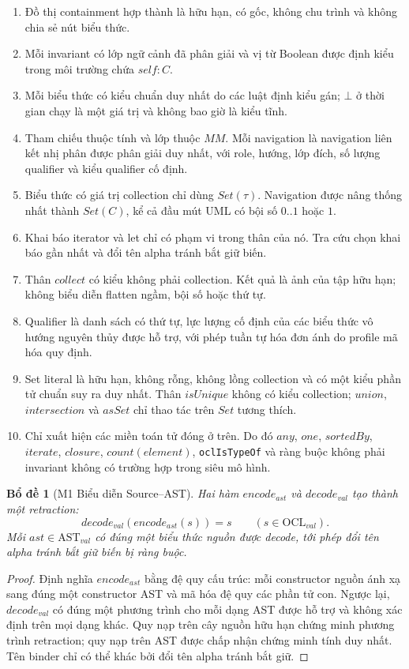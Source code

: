 \documentclass[11pt,a4paper]{article}
\newtheorem{lemma}{Bổ đề}
\theoremstyle{definition}
\newcommand{\OCLval}{\mathrm{OCL}_{val}}
\newcommand{\ASTval}{\mathrm{AST}_{val}}
\begin{document}
\begin{enumerate}[label=(MV-WF\arabic*)]
  \item Đồ thị containment hợp thành là hữu hạn, có gốc, không chu trình và
  không chia sẻ nút biểu thức.
  \item Mỗi invariant có lớp ngữ cảnh đã phân giải và vị từ Boolean được định
  kiểu trong môi trường chứa $self:C$.
  \item Mỗi biểu thức có kiểu chuẩn duy nhất do các luật định kiểu gán; $\bot$
  ở thời gian chạy là một giá trị và không bao giờ là kiểu tĩnh.
  \item Tham chiếu thuộc tính và lớp thuộc $MM$. Mỗi navigation là navigation
  liên kết nhị phân được phân giải duy nhất, với role, hướng, lớp đích, số lượng
  qualifier và kiểu qualifier cố định.
  \item Biểu thức có giá trị collection chỉ dùng $Set(\tau)$. Navigation được
  nâng thống nhất thành $Set(C)$, kể cả đầu mút UML có bội số $0..1$ hoặc $1$.
  \item Khai báo iterator và let chỉ có phạm vi trong thân của nó. Tra cứu chọn
  khai báo gần nhất và đổi tên alpha tránh bắt giữ biến.
  \item Thân $collect$ có kiểu không phải collection. Kết quả là ảnh của tập
  hữu hạn; không biểu diễn flatten ngầm, bội số hoặc thứ tự.
  \item Qualifier là danh sách có thứ tự, lực lượng cố định của các biểu thức vô
  hướng nguyên thủy được hỗ trợ, với phép tuần tự hóa đơn ánh do profile mã hóa
  quy định.
  \item Set literal là hữu hạn, không rỗng, không lồng collection và có một kiểu
  phần tử chuẩn suy ra duy nhất. Thân $isUnique$ không có kiểu collection;
  $union$, $intersection$ và $asSet$ chỉ thao tác trên $Set$ tương thích.
  \item Chỉ xuất hiện các miền toán tử đóng ở trên. Do đó $any$, $one$,
  $sortedBy$, $iterate$, $closure$, $count(element)$,
  \texttt{oclIsTypeOf} và ràng buộc không phải invariant không có trường hợp
  trong siêu mô hình.
\end{enumerate}

\begin{lemma}[M1 Biểu diễn Source--AST]
Hai hàm $encode_{ast}$ và $decode_{val}$ tạo thành một retraction:
\[
decode_{val}(encode_{ast}(s))=s\qquad(s\in\OCLval).
\]
Mỗi $ast\in\ASTval$ có đúng một biểu thức nguồn được decode, tới phép đổi tên
alpha tránh bắt giữ biến bị ràng buộc.
\end{lemma}
\begin{proof}
Định nghĩa $encode_{ast}$ bằng đệ quy cấu trúc: mỗi constructor nguồn ánh xạ
sang đúng một constructor AST và mã hóa đệ quy các phần tử con. Ngược lại,
$decode_{val}$ có đúng một phương trình cho mỗi dạng AST được hỗ trợ và không
xác định trên mọi dạng khác. Quy nạp trên cây nguồn hữu hạn chứng minh phương
trình retraction; quy nạp trên AST được chấp nhận chứng minh tính duy nhất. Tên
binder chỉ có thể khác bởi đổi tên alpha tránh bắt giữ.
\end{proof}
\end{document}
